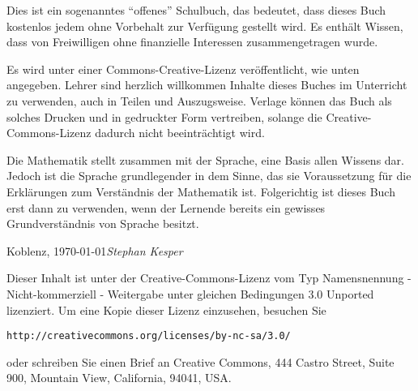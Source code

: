 \preface

Dies ist ein sogenanntes "`offenes"' Schulbuch, das bedeutet, dass dieses Buch kostenlos jedem ohne Vorbehalt zur Verfügung gestellt wird. Es enthält Wissen, dass von Freiwilligen ohne finanzielle Interessen zusammengetragen wurde. 

Es wird unter einer Commons-Creative-Lizenz veröffentlicht, wie unten angegeben. Lehrer sind herzlich willkommen Inhalte dieses Buches im Unterricht zu verwenden, auch in Teilen und Auszugsweise. Verlage können das Buch als solches Drucken und in gedruckter Form vertreiben, solange die Creative-Commons-Lizenz dadurch nicht beeinträchtigt wird.

Die Mathematik stellt zusammen mit der Sprache, eine Basis allen Wissens dar. Jedoch ist die Sprache grundlegender in dem Sinne, das sie Voraussetzung für die Erklärungen zum Verständnis der Mathematik ist. Folgerichtig ist dieses Buch erst dann zu verwenden, wenn der Lernende bereits ein gewisses Grundverständnis von Sprache besitzt. 


\vspace{\baselineskip}
\begin{flushright}\noindent
Koblenz, \today \hfill {\it Stephan Kesper}
\end{flushright}

\vfill

\noindent Dieser Inhalt ist unter der Creative-Commons-Lizenz vom Typ Namensnennung - Nicht-kommerziell - Weitergabe unter gleichen Bedingungen 3.0 Unported lizenziert. Um eine Kopie dieser Lizenz einzusehen, besuchen Sie

\bigskip
\begin{center}
\texttt{http://creativecommons.org/licenses/by-nc-sa/3.0/}
\end{center}

\bigskip

\noindent oder schreiben Sie einen Brief an Creative Commons, 444 Castro Street, Suite 900, Mountain View, California, 94041, USA.



